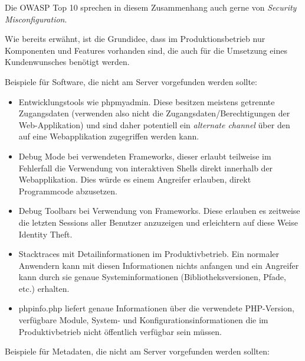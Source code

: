 Die OWASP Top 10 sprechen in diesem Zusammenhang auch gerne von \textit{Security Misconfiguration}.

Wie bereits erwähnt, ist die Grundidee, dass im Produktionsbetrieb nur Komponenten und Features vorhanden sind, die auch für die Umsetzung eines Kundenwunsches benötigt werden.

Beispiele für Software, die nicht am Server vorgefunden werden sollte:

\begin{itemize}
	\item Entwicklungstools wie phpmyadmin. Diese besitzen meistens getrennte Zugangsdaten (verwenden also nicht die Zugangsdaten/Berechtigungen der Web-Applikation) und sind daher potentiell ein \textit{alternate channel} über den auf eine Webapplikation zugegriffen werden kann.
	\item Debug Mode bei verwendeten Frameworks, dieser erlaubt teilweise im Fehlerfall die Verwendung von interaktiven Shells direkt innerhalb der Webapplikation. Dies würde es einem Angreifer erlauben, direkt Programmcode abzusetzen.
	\item Debug Toolbars bei Verwendung von Frameworks. Diese erlauben es zeitweise die letzten Sessions aller Benutzer anzuzeigen und erleichtern auf diese Weise Identity Theft.
	\item Stacktraces mit Detailinformationen im Produktivbetrieb. Ein normaler Anwendern kann mit diesen Informationen nichts anfangen und ein Angreifer kann durch sie genaue Systeminformationen (Bibliotheksversionen, Pfade, etc.) erhalten.
	\item phpinfo.php liefert genaue Informationen über die verwendete PHP-Version, verfügbare Module, System- und Konfigurationsinformationen die im Produktivbetrieb nicht öffentlich verfügbar sein müssen.
\end{itemize}

Beispiele für Metadaten, die nicht am Server vorgefunden werden sollten:

